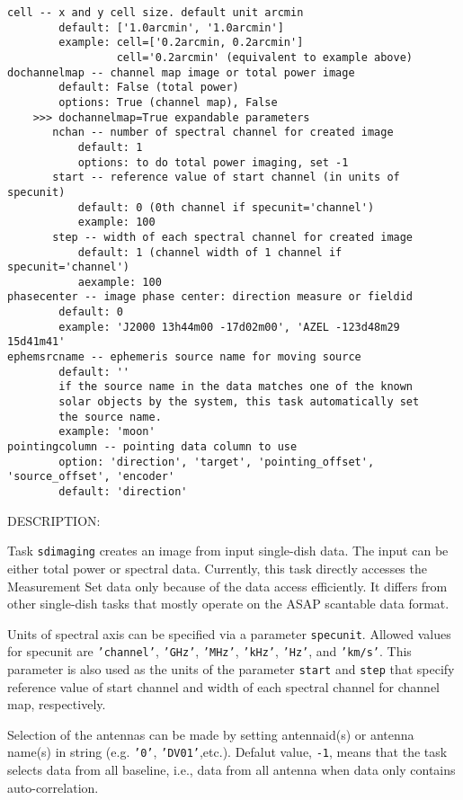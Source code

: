 \begin{verbatim}
cell -- x and y cell size. default unit arcmin
        default: ['1.0arcmin', '1.0arcmin']
        example: cell=['0.2arcmin, 0.2arcmin']
                 cell='0.2arcmin' (equivalent to example above)
dochannelmap -- channel map image or total power image
        default: False (total power)
        options: True (channel map), False
    >>> dochannelmap=True expandable parameters
       nchan -- number of spectral channel for created image
           default: 1 
           options: to do total power imaging, set -1 
       start -- reference value of start channel (in units of specunit)
           default: 0 (0th channel if specunit='channel')
           example: 100
       step -- width of each spectral channel for created image
           default: 1 (channel width of 1 channel if specunit='channel')
           aexample: 100
phasecenter -- image phase center: direction measure or fieldid 
        default: 0
        example: 'J2000 13h44m00 -17d02m00', 'AZEL -123d48m29 15d41m41'
ephemsrcname -- ephemeris source name for moving source
        default: ''
        if the source name in the data matches one of the known 
        solar objects by the system, this task automatically set 
        the source name. 
        example: 'moon' 
pointingcolumn -- pointing data column to use
        option: 'direction', 'target', 'pointing_offset', 'source_offset', 'encoder' 
        default: 'direction'
\end{verbatim}

DESCRIPTION:

Task {\tt sdimaging} creates an image from input single-dish data.
The input can be either total power or spectral data. Currently,
this task directly accesses the Measurement Set data only because of 
the data access efficiently. It differs from other single-dish tasks 
that mostly operate on the ASAP scantable data format.
 
Units of spectral axis can be specified via a parameter {\tt specunit}.
Allowed values for specunit are {\tt 'channel'}, {\tt 'GHz'}, {\tt 'MHz'}, {\tt 'kHz'}, {\tt 'Hz'}, 
and {\tt 'km/s'}. This parameter is also used as the units of the parameter 
{\tt start} and {\tt step} that specify reference value of start channel and width 
of each spectral channel for channel map, respectively.

Selection of the antennas can be made by setting antennaid(s) or 
antenna name(s) in string (e.g. {\tt '0'}, {\tt 'DV01'},etc.). Defalut
value, {\tt -1}, means 
that the task selects data from all baseline, i.e., data from all antenna when 
data only contains auto-correlation.

